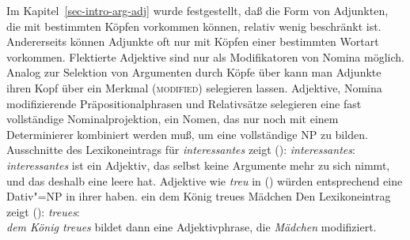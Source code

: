 Im Kapitel~\ref{sec-intro-arg-adj} wurde festgestellt, daß die Form von Adjunkten,
die mit bestimmten Köpfen vorkommen können, relativ wenig beschränkt ist. Andererseits
können Adjunkte oft nur mit Köpfen einer bestimmten Wortart vorkommen. Flektierte
Adjektive sind \zb nur als Modifikatoren von Nomina möglich. 
\eal
{}
\zl
Analog zur Selektion von Argumenten durch Köpfe über \subcat kann
man Adjunkte ihren Kopf über ein Merkmal (\textsc{modified}) selegieren lassen.
Adjektive, Nomina modifizierende Präpositionalphrasen und Relativsätze
selegieren eine fast vollständige Nominalprojektion, \dash ein Nomen, das
nur noch mit einem Determinierer kombiniert werden muß, um eine vollständige
NP zu bilden. Ausschnitte des Lexikoneintrags für \emph{interessantes} zeigt ():
\ea{}
\label{le-interessantes}
\emph{interessantes}:\\
\z
\emph{interessantes} ist ein Adjektiv, das selbst keine Argumente mehr zu sich nimmt,
und das deshalb eine leere \subcatl hat. Adjektive wie \emph{treu} in () würden entsprechend
eine Dativ"=NP in ihrer \subcatl haben.
\ea
ein dem König treues Mädchen
\z
Den Lexikoneintrag zeigt ():
\ea
\label{le-treue}
\emph{treues}:\\
\z
\emph{dem König treues} bildet dann eine Adjektivphrase, die \emph{Mädchen} modifiziert.

